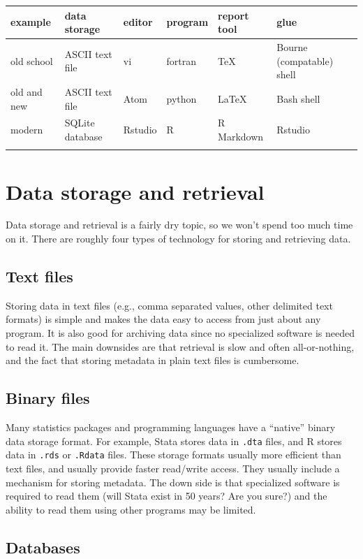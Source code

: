 \documentclass[]{book}
\begin{document}
\begin{longtable}[]{@{}llllll@{}}
\toprule
example & data storage & editor & program & report tool &
glue\tabularnewline
\midrule
\endhead
old school & ASCII text file & vi & fortran & TeX & Bourne (compatable)
shell\tabularnewline
old and new & ASCII text file & Atom & python & LaTeX & Bash
shell\tabularnewline
modern & SQLite database & Rstudio & R & R Markdown &
Rstudio\tabularnewline
& & & & &\tabularnewline
\bottomrule
\end{longtable}

\section{Data storage and retrieval}\label{data-storage-and-retrieval}

Data storage and retrieval is a fairly dry topic, so we won't spend too
much time on it. There are roughly four types of technology for storing
and retrieving data.

\subsection{Text files}\label{text-files}

Storing data in text files (e.g., comma separated values, other
delimited text formats) is simple and makes the data easy to access from
just about any program. It is also good for archiving data since no
specialized software is needed to read it. The main downsides are that
retrieval is slow and often all-or-nothing, and the fact that storing
metadata in plain text files is cumbersome.

\subsection{Binary files}\label{binary-files}

Many statistics packages and programming languages have a ``native''
binary data storage format. For example, Stata stores data in
\texttt{.dta} files, and R stores data in \texttt{.rds} or
\texttt{.Rdata} files. These storage formats usually more efficient than
text files, and usually provide faster read/write access. They usually
include a mechanism for storing metadata. The down side is that
specialized software is required to read them (will Stata exist in 50
years? Are you sure?) and the ability to read them using other programs
may be limited.

\subsection{Databases}\label{databases}
\end{document}

